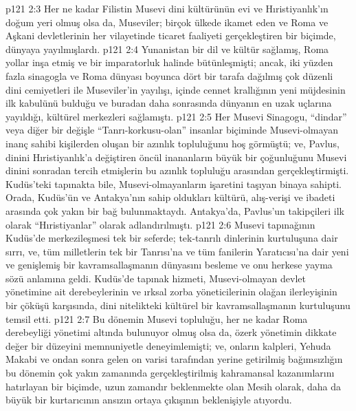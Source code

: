 \vs p121 2:3 Her ne kadar Filistin Musevi dini kültürünün evi ve Hıristiyanlık’ın doğum yeri olmuş olsa da, Museviler; birçok ülkede ikamet eden ve Roma ve Aşkani devletlerinin her vilayetinde ticaret faaliyeti gerçekleştiren bir biçimde, dünyaya yayılmışlardı.
\vs p121 2:4 Yunanistan bir dil ve kültür sağlamış, Roma yollar inşa etmiş ve bir imparatorluk halinde bütünleşmişti; ancak, iki yüzden fazla sinagogla ve Roma dünyası boyunca dört bir tarafa dağılmış çok düzenli dini cemiyetleri ile Museviler’in yayılışı, içinde cennet krallığının yeni müjdesinin ilk kabulünü bulduğu ve buradan daha sonrasında dünyanın en uzak uçlarına yayıldığı, kültürel merkezleri sağlamıştı.
\vs p121 2:5 Her Musevi Sinagogu, “dindar” veya diğer bir değişle “Tanrı\hyp{}korkusu\hyp{}olan” insanlar biçiminde Musevi\hyp{}olmayan inanç sahibi kişilerden oluşan bir azınlık topluluğunu hoş görmüştü; ve, Pavlus, dinini Hıristiyanlık’a değiştiren öncül inananların büyük bir çoğunluğunu Musevi dinini sonradan tercih etmişlerin bu azınlık topluluğu arasından gerçekleştirmişti. Kudüs’teki tapınakta bile, Musevi\hyp{}olmayanların işaretini taşıyan binaya sahipti. Orada, Kudüs’ün ve Antakya’nın sahip oldukları kültürü, alış\hyp{}verişi ve ibadeti arasında çok yakın bir bağ bulunmaktaydı. Antakya’da, Pavlus’un takipçileri ilk olarak “Hıristiyanlar” olarak adlandırılmıştı.
\vs p121 2:6 Musevi tapınağının Kudüs’de merkezileşmesi tek bir seferde; tek\hyp{}tanrılı dinlerinin kurtuluşuna dair sırrı, ve, tüm milletlerin tek bir Tanrısı’na ve tüm fanilerin Yaratıcısı’na dair yeni ve genişlemiş bir kavramsallaşmanın dünyasını besleme ve onu herkese yayma sözü anlamına geldi. Kudüs’de tapınak hizmeti, Musevi\hyp{}olmayan devlet yönetimine ait derebeylerinin ve ırksal zorba yöneticilerinin olağan ilerleyişinin bir çöküşü karşısında, dini nitelikteki kültürel bir kavramsallaşmanın kurtuluşunu temsil etti.
\vs p121 2:7 Bu dönemin Musevi topluluğu, her ne kadar Roma derebeyliği yönetimi altında bulunuyor olmuş olsa da, özerk yönetimin dikkate değer bir düzeyini memnuniyetle deneyimlemişti; ve, onların kalpleri, Yehuda Makabi ve ondan sonra gelen on varisi tarafından yerine getirilmiş bağımsızlığın bu dönemin çok yakın zamanında gerçekleştirilmiş kahramansal kazanımlarını hatırlayan bir biçimde, uzun zamandır beklenmekte olan Mesih olarak, daha da büyük bir kurtarıcının ansızın ortaya çıkışının beklenişiyle atıyordu.
